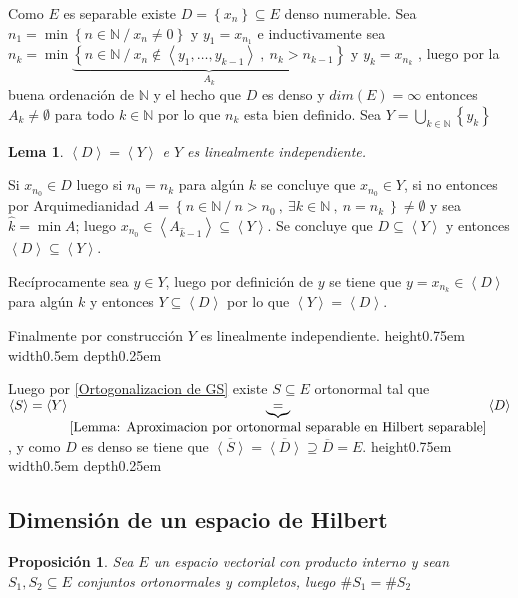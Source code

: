 \documentclass[11pt]{article}
\newcommand{\N}{{\mathbb{N}}}
\newcommand{\ip}[1]{\left\langle#1\right\rangle}
\newcommand{\sett}[1]{\left\lbrace#1\right\rbrace}
\newcommand{\Bigcup}[2]{\bigcup\limits_{#1}{#2}}
\numberwithin{theorem}{subsection}
\newtheorem{lemma}[theorem]{Lema}
\newtheorem{proposition}[theorem]{Proposici\'on}
\newenvironment{proof}[1][Demostraci\'on]{\begin{trivlist}
		\item[\hskip \labelsep {\bfseries #1}]}{\end{trivlist}}
\newcommand{\qed}{\nobreak \ifvmode \relax \else
	\ifdim\lastskip<1.5em \hskip-\lastskip
	\hskip1.5em plus0em minus0.5em \fi \nobreak
	\vrule height0.75em width0.5em depth0.25em\fi}
\begin{document}
\begin{proof}
	Como $E$ es separable existe $D = \sett{x_n} \subseteq E$ denso numerable. Sea $n_1 = \min\sett{n \in \N \ / \ x_n \neq 0}$ y $y_1 = x_{n_1}$ e inductivamente sea $n_k = \min\underbrace{\sett{n \in \N \ / \ x_n \not \in \ip{y_1, \dots, y_{k-1}} \ , \ n_k > n_{k-1}}}_{A_k}$ y $y_k = x_{n_k}$ , luego por la buena ordenaci\'on de $\N$ y el hecho que $D$ es denso y $dim(E)= \infty$ entonces $A_k \neq \emptyset$ para todo $k \in \N$ por lo que $n_k$ esta bien definido. Sea $Y = \Bigcup{k \in \N}{\sett{y_k}}$
	
	\begin{lemma}
		\label{Lemma: Aproximacion por ortonormal separable en Hilbert separable}
		$\ip{D} = \ip{Y}$ e $Y$ es linealmente independiente.
	\end{lemma}
	
	\begin{proof}[Demostraci\'on (del Lema)]
		
		Si $x_{n_0} \in D$ luego si $n_0 = n_k$ para alg\'un $k$ se concluye que $x_{n_0} \in Y$, si no entonces por Arquimedianidad $A = \sett{n \in \N \ / \ n > n_0 \ , \ \exists k \in \N \ , \ n = n_k \ } \neq \emptyset$ y sea $\hat{k} = \min A$; luego $x_{n_0} \in \ip{A_{\hat{k}-1}} \subseteq \ip{Y}$. Se concluye que $D \subseteq \ip{Y}$ y entonces $\ip{D} \subseteq \ip{Y}$.
		
		Rec\'iprocamente sea $y \in Y$, luego por definici\'on de $y$ se tiene que $y = x_{n_k} \in \ip{D}$ para alg\'un $k$ y entonces $Y \subseteq \ip{D}$ por lo que $\ip{Y} = \ip{D}$.
		
		Finalmente por construcci\'on $Y$ es linealmente independiente. \qed  
		
	\end{proof}
	
	Luego por \ref{Ortogonalizacion de GS} existe $S \subseteq E$ ortonormal tal que $\ip{S} = \ip{Y} \underbrace{=}_{\ref{Lemma: Aproximacion por ortonormal separable en Hilbert separable}} \ip{D}$, y como $D$ es denso se tiene que $\overline{\ip{S}} = \overline{\ip{D}} \supseteq \overline{D} = E$. \qed
	
	
\end{proof}

\subsection{Dimensi\'on de un espacio de Hilbert}

\begin{proposition}
	\label{Dos sistemas ortonormales y completos tienen el mismo cardinal}
	Sea $E$ un espacio vectorial con producto interno y sean $S_1,S_2 \subseteq E$ conjuntos ortonormales y completos, luego $\# S_1 = \# S_2$ 
\end{proposition}
\end{document}
